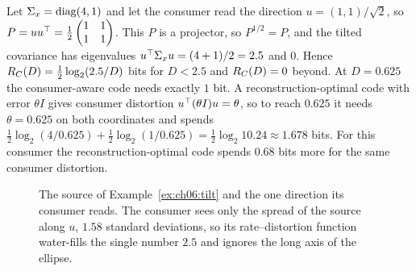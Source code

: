 \begin{example}\label{ex:ch06:tilt}
Let $\Sigma_x=\operatorname{diag}(4,1)$ and let the consumer read the direction $u=(1,1)/\sqrt2$, so $P=uu^{\top}=\tfrac12\begin{pmatrix}1&1\\1&1\end{pmatrix}$. This $P$ is a projector, so $P^{1/2}=P$, and the tilted covariance has eigenvalues $u^{\top}\Sigma_xu=(4+1)/2=2.5$ and $0$. Hence $R_C(D)=\tfrac12\log_2(2.5/D)$ bits for $D<2.5$ and $R_C(D)=0$ beyond. At $D=0.625$ the consumer-aware code needs exactly $1$ bit. A reconstruction-optimal code with error $\theta I$ gives consumer distortion $u^{\top}(\theta I)u=\theta$, so to reach $0.625$ it needs $\theta=0.625$ on both coordinates and spends $\tfrac12\log_2(4/0.625)+\tfrac12\log_2(1/0.625)=\tfrac12\log_2 10.24\approx1.678$ bits. For this consumer the reconstruction-optimal code spends $0.68$ bits more for the same consumer distortion.
\end{example}

\begin{figure}[tbp]\centering
{}
\caption{The source of Example~\ref{ex:ch06:tilt} and the one direction its consumer reads. The consumer sees only the spread of the source along $u$, $1.58$ standard deviations, so its rate--distortion function water-fills the single number $2.5$ and ignores the long axis of the ellipse.}
\label{fig:ch06:readsignal}
\end{figure}


